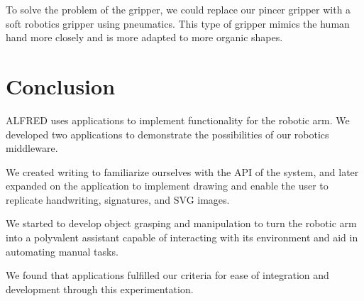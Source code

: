 To solve the problem of the gripper, we could replace our pincer gripper with a soft robotics gripper using pneumatics. This type of gripper mimics the human hand more closely and is more adapted to more organic shapes.



\section{Conclusion}

ALFRED uses applications to implement functionality for the robotic arm. We developed two applications to demonstrate the possibilities of our robotics middleware.

We created writing to familiarize ourselves with the API of the system, and later expanded on the application to implement drawing and enable the user to replicate handwriting, signatures, and SVG images.

We started to develop object grasping and manipulation to turn the robotic arm into a polyvalent assistant capable of interacting with its environment and aid in automating manual tasks.

We found that applications fulfilled our criteria for ease of integration and development through this experimentation.
